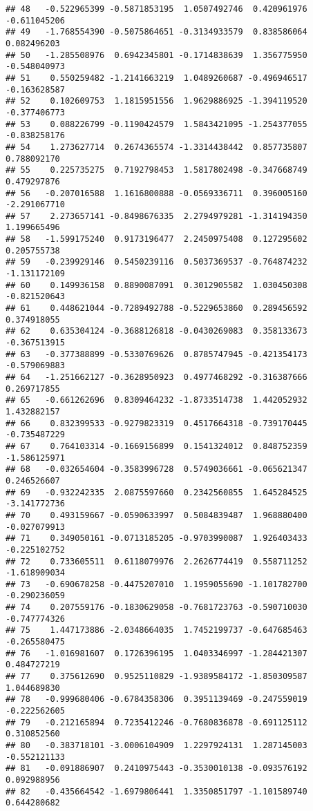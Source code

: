 \documentclass[
]{article}
\begin{document}
\begin{verbatim}
## 48   -0.522965399 -0.5871853195  1.0507492746  0.420961976 -0.611045206
## 49   -1.768554390 -0.5075864651 -0.3134933579  0.838586064  0.082496203
## 50   -1.285508976  0.6942345801 -0.1714838639  1.356775950 -0.548040973
## 51    0.550259482 -1.2141663219  1.0489260687 -0.496946517 -0.163628587
## 52    0.102609753  1.1815951556  1.9629886925 -1.394119520 -0.377406773
## 53    0.088226799 -0.1190424579  1.5843421095 -1.254377055 -0.838258176
## 54    1.273627714  0.2674365574 -1.3314438442  0.857735807  0.788092170
## 55    0.225735275  0.7192798453  1.5817802498 -0.347668749  0.479297876
## 56   -0.207016588  1.1616800888 -0.0569336711  0.396005160 -2.291067710
## 57    2.273657141 -0.8498676335  2.2794979281 -1.314194350  1.199665496
## 58   -1.599175240  0.9173196477  2.2450975408  0.127295602  0.205755738
## 59   -0.239929146  0.5450239116  0.5037369537 -0.764874232 -1.131172109
## 60    0.149936158  0.8890087091  0.3012905582  1.030450308 -0.821520643
## 61    0.448621044 -0.7289492788 -0.5229653860  0.289456592  0.374918055
## 62    0.635304124 -0.3688126818 -0.0430269083  0.358133673 -0.367513915
## 63   -0.377388899 -0.5330769626  0.8785747945 -0.421354173 -0.579069883
## 64   -1.251662127 -0.3628950923  0.4977468292 -0.316387666  0.269717855
## 65   -0.661262696  0.8309464232 -1.8733514738  1.442052932  1.432882157
## 66    0.832399533 -0.9279823319  0.4517664318 -0.739170445 -0.735487229
## 67    0.764103314 -0.1669156899  0.1541324012  0.848752359 -1.586125971
## 68   -0.032654604 -0.3583996728  0.5749036661 -0.065621347  0.246526607
## 69   -0.932242335  2.0875597660  0.2342560855  1.645284525 -3.141772736
## 70    0.493159667 -0.0590633997  0.5084839487  1.968880400 -0.027079913
## 71    0.349050161 -0.0713185205 -0.9703990087  1.926403433 -0.225102752
## 72    0.733605511  0.6118079976  2.2626774419  0.558711252 -1.618909034
## 73   -0.690678258 -0.4475207010  1.1959055690 -1.101782700 -0.290236059
## 74    0.207559176 -0.1830629058 -0.7681723763 -0.590710030 -0.747774326
## 75    1.447173886 -2.0348664035  1.7452199737 -0.647685463 -0.265580475
## 76   -1.016981607  0.1726396195  1.0403346997 -1.284421307  0.484727219
## 77    0.375612690  0.9525110829 -1.9389584172 -1.850309587  1.044689830
## 78   -0.999680406 -0.6784358306  0.3951139469 -0.247559019 -0.222562605
## 79   -0.212165894  0.7235412246 -0.7680836878 -0.691125112  0.310852560
## 80   -0.383718101 -3.0006104909  1.2297924131  1.287145003 -0.552121133
## 81   -0.091886907  0.2410975443 -0.3530010138 -0.093576192  0.092988956
## 82   -0.435664542 -1.6979806441  1.3350851797 -1.101589740  0.644280682

\end{verbatim}
\end{document}
